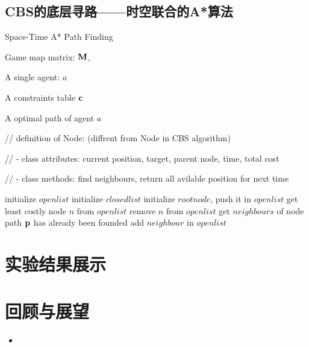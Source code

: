 \documentclass[UTF8]{ctexart}  %
\begin{document}
\subsection{CBS的底层寻路——时空联合的A*算法}

\begin{algorithm}
    \renewcommand{\algorithmicrequire}{\textbf{Input:}}
	\renewcommand{\algorithmicensure}{\textbf{Output:}}
    \caption{Space-Time A* Path Finding}
    \label{alg:example}
    \begin{algorithmic}[3]
        \REQUIRE 
            Game map matrix: $\bf M$,

            A single agent: $a$

            A constraints table $\bf c$ 
            
        \ENSURE
            A optimal path of agent $a$

        // definition of Node: (diffrent from Node in CBS algorithm)

        // - class attributes: current position, target, parent node, time, total cost      

        // - class methods: find neighbours, return all avilable position for next time
        

        \STATE initialize $open list$  
        \STATE initialize $closed list$
        \STATE initialize $root node$, push it in $open list$
            \STATE get least costly node $n$ from $open list$
            \STATE remove $n$ from $open list$
            \STATE get $neighbours$  of node
                    \STATE path $\bf p$ has already been founded
                \ELSE
                    \STATE add $neighbour$ in $open list$
                \ENDIF
            \ENDFOR
        \ENDWHILE
    \end{algorithmic}
\end{algorithm}

\section{实验结果展示}
\section{回顾与展望}


\begin{itemize}

\item{}

\end{itemize}
\end{document}
